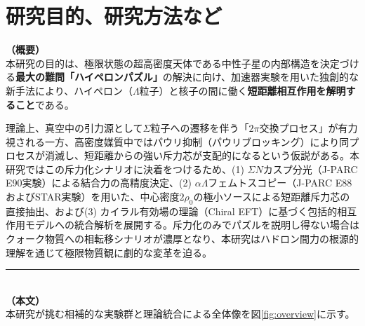 \documentclass[11pt,a4j,dvipdfmx]{jarticle} 					%
\newcommand{\研究課題名}{加速器実験による短距離バリオン間相互作用の解明と中性子星ハイペロンパズルの解決}
\newcommand{\研究機関名}{東北大学}
\newcommand{\研究代表者氏名}{市川裕大}
\newcommand{\研究期間の最終元号年度}{13}
\begin{document}

\section{研究目的、研究方法など}

\noindent
\textbf{（概要）}\\
	本研究の目的は、極限状態の超高密度天体である中性子星の内部構造を決定づける\textbf{最大の難問「ハイペロンパズル」}の解決に向け、加速器実験を用いた独創的な新手法により、ハイペロン（$\Lambda$粒子）と核子の間に働く\textbf{短距離相互作用を解明すること}である。
	
	理論上、真空中の引力源として$\Sigma$粒子への遷移を伴う「$2\pi$交換プロセス」が有力視される一方、高密度媒質中ではパウリ抑制（パウリブロッキング）により同プロセスが消滅し、短距離からの強い斥力芯が支配的になるという仮説がある。本研究ではこの斥力化シナリオに決着をつけるため、(1) $\Sigma N$カスプ分光（J-PARC E90実験）による結合力の高精度決定、(2) $\alpha\Lambda$フェムトスコピー（J-PARC E88およびSTAR実験）を用いた、中心密度$2\rho_0$の極小ソースによる短距離斥力芯の直接抽出、および(3) カイラル有効場の理論（Chiral EFT）に基づく包括的相互作用モデルへの統合解析を展開する。斥力化のみでパズルを説明し得ない場合はクォーク物質への相転移シナリオが濃厚となり、本研究はハドロン間力の根源的理解を通じて極限物質観に劇的な変革を迫る。
	
	\vspace*{1zw}

\noindent
\rule{\linewidth}{1pt}\\
\noindent
\textbf{（本文）}\\
本研究が挑む相補的な実験群と理論統合による全体像を図\ref{fig:overview}に示す。
\end{document}

